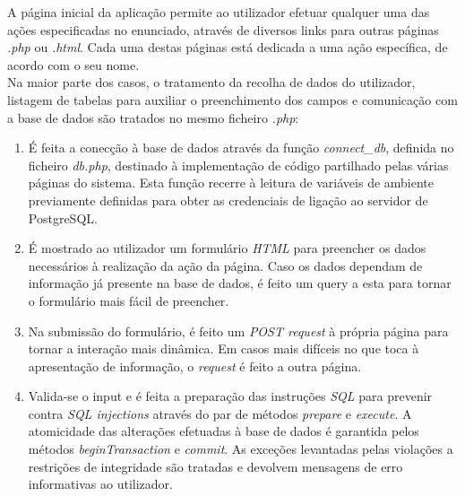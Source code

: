 \documentclass[12pt]{report}
\begin{document}
    \normalsize
    \vspace{2mm}

    \hspace*{1em}
    A página inicial da aplicação permite ao utilizador efetuar qualquer uma das ações especificadas no enunciado, através de diversos links para outras páginas \textit{.php} ou \textit{.html}. Cada uma destas páginas está dedicada a uma ação específica, de acordo com o seu nome. \\

    \hspace*{1em} Na maior parte dos casos, o tratamento da recolha de dados do utilizador, listagem de tabelas para auxiliar o preenchimento dos campos e comunicação com a base de dados são tratados no mesmo ficheiro \textit{.php}:
    \\
    \begin{enumerate}
        \item É feita a conecção à base de dados através da função \textit{connect\_db}, definida no ficheiro \textit{db.php}, destinado à implementação de código partilhado pelas várias páginas do sistema. Esta função recerre à leitura de variáveis de ambiente previamente definidas para obter as credenciais de ligação ao servidor de PostgreSQL.
        \item É mostrado ao utilizador um formulário \textit{HTML} para preencher os dados necessários à realização da ação da página. Caso os dados dependam de informação já presente na base de dados, é feito um query a esta para tornar o formulário mais fácil de preencher.
        \item Na submissão do formulário, é feito um \textit{POST request} à própria página para tornar a interação mais dinâmica. Em casos mais difíceis no que toca à apresentação de informação, o \textit{request} é feito a outra página.
        \item Valida-se o input e é feita a preparação das instruções \textit{SQL} para prevenir contra \textit{SQL injections} através do par de métodos \textit{prepare} e \textit{execute}. A atomicidade das alterações efetuadas à base de dados é garantida pelos métodos \textit{beginTransaction} e \textit{commit}. As exceções levantadas pelas violações a restrições de integridade são tratadas e devolvem mensagens de erro informativas ao utilizador.
    \end{enumerate}




\end{document}
